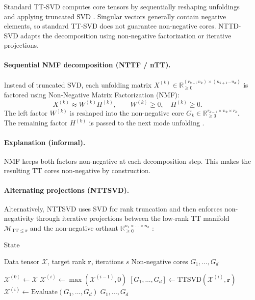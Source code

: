\documentclass[11pt,a4paper,parskip=half-]{scrartcl}
\theoremstyle{definition}
\theoremstyle{plain}
\theoremstyle{remark}
\begin{document}
Standard TT-SVD computes core tensors by sequentially reshaping unfoldings and
applying truncated SVD \cite{Oseledets2011TT}. Singular vectors generally
contain negative elements, so standard TT-SVD does not guarantee non-negative
cores. NTTD-SVD adapts the decomposition using non-negative factorization or
iterative projections.

\paragraph{Sequential NMF decomposition (NTTF / nTT).}
Instead of truncated SVD, each unfolding matrix
$X^{(k)} \in \mathbb{R}_{\ge 0}^{(r_{k-1}n_k) \times (n_{k+1}\dots n_d)}$ is
factored using Non-Negative Matrix Factorization (NMF):
\begin{equation}
X^{(k)} \approx W^{(k)} H^{(k)}, \qquad W^{(k)} \ge 0, \quad H^{(k)} \ge 0.
\end{equation}
The left factor $W^{(k)}$ is reshaped into the non-negative core
$G_k \in \mathbb{R}_{\ge 0}^{r_{k-1} \times n_k \times r_k}$. The remaining
factor $H^{(k)}$ is passed to the next mode unfolding
\cite{shcherbakova2019nonnegative, bhattarai2020distributed}.

\paragraph{Explanation (informal).}
NMF keeps both factors non-negative at each decomposition step. This makes the
resulting TT cores non-negative by construction.

\paragraph{Alternating projections (NTTSVD).}
Alternatively, NTTSVD uses SVD for rank truncation and then enforces
non-negativity through iterative projections between the low-rank TT manifold
$\mathcal{M}_{\text{TT} \le \mathbf{r}}$ and the non-negative orthant
$\mathbb{R}_{\ge 0}^{n_1 \times \dots \times n_d}$
\cite{sultonov2023nonnegative}:

\begin{algorithm}[H]State
  \caption{NTTSVD via Alternating Projections}
  \begin{algorithmic}[1]
    \Require Data tensor $\mathcal{X}$, target rank $\mathbf{r}$, iterations $s$
    \Ensure Non-negative cores $G_1, \dots, G_d$
    
    \State $\mathcal{X}^{(0)} \leftarrow \mathcal{X}$
        \State $\mathcal{X}^{(i)} \leftarrow \max\left(\mathcal{X}^{(i-1)}, 0\right)$ 
        \State $[G_1, \dots, G_d] \leftarrow \text{TTSVD}(\mathcal{X}^{(i)}, \mathbf{r})$ 
        \State $\mathcal{X}^{(i)} \leftarrow \text{Evaluate}(G_1, \dots, G_d)$
    \EndFor
    \State \Return $G_1, \dots, G_d$
  \end{algorithmic}
\end{algorithm}
\end{document}
